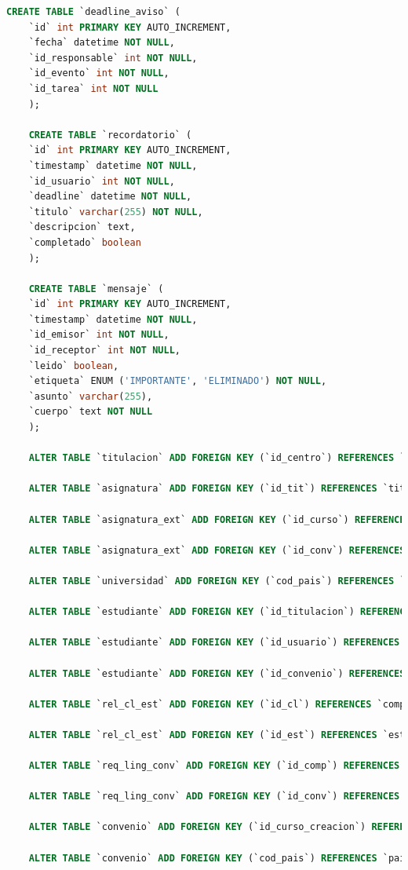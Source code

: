\begin{lstlisting}[language=sql]
	CREATE TABLE `deadline_aviso` (
	`id` int PRIMARY KEY AUTO_INCREMENT,
	`fecha` datetime NOT NULL,
	`id_responsable` int NOT NULL,
	`id_evento` int NOT NULL,
	`id_tarea` int NOT NULL
	);
	
	CREATE TABLE `recordatorio` (
	`id` int PRIMARY KEY AUTO_INCREMENT,
	`timestamp` datetime NOT NULL,
	`id_usuario` int NOT NULL,
	`deadline` datetime NOT NULL,
	`titulo` varchar(255) NOT NULL,
	`descripcion` text,
	`completado` boolean
	);
	
	CREATE TABLE `mensaje` (
	`id` int PRIMARY KEY AUTO_INCREMENT,
	`timestamp` datetime NOT NULL,
	`id_emisor` int NOT NULL,
	`id_receptor` int NOT NULL,
	`leido` boolean,
	`etiqueta` ENUM ('IMPORTANTE', 'ELIMINADO') NOT NULL,
	`asunto` varchar(255),
	`cuerpo` text NOT NULL
	);
	
	ALTER TABLE `titulacion` ADD FOREIGN KEY (`id_centro`) REFERENCES `centro` (`id`);
	
	ALTER TABLE `asignatura` ADD FOREIGN KEY (`id_tit`) REFERENCES `titulacion` (`id`);
	
	ALTER TABLE `asignatura_ext` ADD FOREIGN KEY (`id_curso`) REFERENCES `curso` (`id`);
	
	ALTER TABLE `asignatura_ext` ADD FOREIGN KEY (`id_conv`) REFERENCES `convenio` (`id`);
	
	ALTER TABLE `universidad` ADD FOREIGN KEY (`cod_pais`) REFERENCES `pais` (`iso`);
	
	ALTER TABLE `estudiante` ADD FOREIGN KEY (`id_titulacion`) REFERENCES `titulacion` (`id`);
	
	ALTER TABLE `estudiante` ADD FOREIGN KEY (`id_usuario`) REFERENCES `user` (`id`);
	
	ALTER TABLE `estudiante` ADD FOREIGN KEY (`id_convenio`) REFERENCES `convenio` (`id`);
	
	ALTER TABLE `rel_cl_est` ADD FOREIGN KEY (`id_cl`) REFERENCES `competencia_ling` (`id`);
	
	ALTER TABLE `rel_cl_est` ADD FOREIGN KEY (`id_est`) REFERENCES `estudiante` (`id_usuario`);
	
	ALTER TABLE `req_ling_conv` ADD FOREIGN KEY (`id_comp`) REFERENCES `competencia_ling` (`id`);
	
	ALTER TABLE `req_ling_conv` ADD FOREIGN KEY (`id_conv`) REFERENCES `convenio` (`id`);
	
	ALTER TABLE `convenio` ADD FOREIGN KEY (`id_curso_creacion`) REFERENCES `curso` (`id`);
	
	ALTER TABLE `convenio` ADD FOREIGN KEY (`cod_pais`) REFERENCES `pais` (`iso`);
	

\end{lstlisting}
